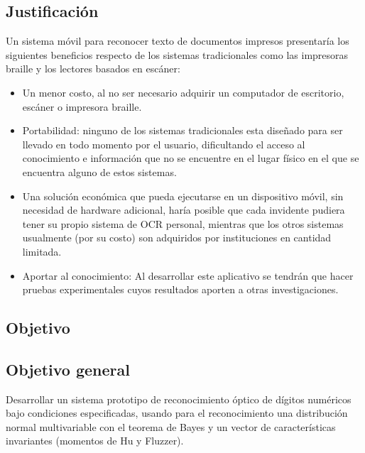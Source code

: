 \documentclass[a4paper, 11pt, oneside]{article}
\begin{document}
	\clearpage

	\begin{center}
	\section{Justificación}
	\end{center}
	
	Un sistema móvil para reconocer texto de documentos impresos presentaría los siguientes beneficios respecto de los sistemas tradicionales como las impresoras braille y los lectores basados en escáner:

	\begin{itemize} 

	\item Un menor costo, al no ser necesario adquirir un computador de escritorio, escáner o impresora braille.

	\item Portabilidad: ninguno de los sistemas tradicionales esta diseñado para ser llevado en todo momento por el usuario, dificultando el acceso al conocimiento e información que no se encuentre en el lugar físico en el que se encuentra alguno de estos sistemas.
	
	\item Una solución económica que pueda ejecutarse en un dispositivo móvil, sin necesidad de hardware adicional, haría posible que cada invidente pudiera tener su propio sistema de OCR personal, mientras que los otros sistemas usualmente (por su costo) son adquiridos por instituciones en cantidad limitada.

	\item Aportar al conocimiento: Al desarrollar este aplicativo se tendrán que hacer pruebas experimentales cuyos resultados aporten a otras investigaciones.
	\end{itemize}
	\clearpage

	\begin{center}
	\section{Objetivo}
	\end{center}
	
	\subsection{Objetivo general}
	Desarrollar un sistema prototipo de reconocimiento óptico de dígitos numéricos bajo condiciones especificadas, 
	usando para el reconocimiento una distribución normal multivariable con el teorema de Bayes
	y un vector de características invariantes (momentos de Hu y Fluzzer).
\end{document}
